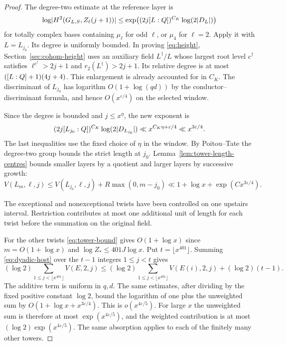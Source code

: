 \begin{proof}
The degree-two estimate at the reference layer is
\begin{equation}\label{eq:height}
 \log\lvert H^2(G_{L,S},Z_\ell(j+1))\rvert
      \le \exp\bigl((2j[L:Q])^{C_K}\log(2\lvert D_L\rvert)\bigr)
\end{equation}
for totally complex bases containing \(\mu_\ell\) for odd
\(\ell\), or \(\mu_4\) for \(\ell=2\). Apply it with \(L=L_{j_0}\).
Its degree is uniformly bounded. In proving \eqref{eq:height},
Section~\ref{sec:cohom-height} uses an auxiliary field
\(L^\dagger/L\) whose largest root level \(c^\dagger\) satisfies
\(\ell^{c^\dagger}>2j+1\) and \(r_2(L^\dagger)>2j+1\).
Its relative degree is at most \(([L:Q]+1)(4j+4)\).
This enlargement is already accounted for in \(C_K\).
The discriminant of \(L_{j_0}\)
has logarithm \(O(1+\log(qd))\) by the conductor--discriminant
formula, and hence \(O(x^{\varepsilon/4})\) on the selected window.

Since the degree is bounded and \(j\le x^\eta\), the new
exponent is
\[
   (2j[L_{j_0}:Q])^{C_K}\log(2|D_{L_{j_0}}|)
       \ll x^{C_K\eta+\varepsilon/4}
       \ll x^{3\varepsilon/4}.
\]
The last inequalities use the fixed choice of \(\eta\) in the
window.
By Poitou--Tate the degree-two group bounds the strict length
at \(j_0\). Lemma~\ref{lem:tower-length-centres} bounds smaller
layers by a quotient and larger layers by successive growth:
\[
 V(L_m,\ell,j)\le V(L_{j_0},\ell,j)+R\max(0,m-j_0)
       \ll 1+\log x+\exp(Cx^{3\varepsilon/4}).
\]

The exceptional and nonexceptional twists have been controlled on one upstairs interval. Restriction contributes at most one additional unit of length for each twist before the summation on the original field.

For the other twists \eqref{eq:tower-bound} gives
\(O(1+\log x)\) since \(m=O(1+\log x)\) and
\(\log Z_*\le401J\log x\). Put \(t=\lfloor x^{401}\rfloor\).
Summing \eqref{eq:dyadic-host} over the \(t-1\) integers
\(1\le j<t\) gives
\[
 (\log 2)\sum_{1\le j<\lfloor x^{401}\rfloor} V(E,2,j)
 \le (\log 2)\sum_{1\le j<\lfloor x^{401}\rfloor} V(E(i),2,j)
      +(\log 2)(t-1) .
\]
The additive term is uniform in \(q,d\). The same estimates, after dividing by the fixed positive constant \(\log 2\), bound the logarithm of one plus the unweighted sum by \(O(1+\log x+x^{3\varepsilon/4})\). This is \(o(x^{4\varepsilon/5})\). For large \(x\) the unweighted sum is therefore at most \(\exp(x^{4\varepsilon/5})\), and the weighted contribution is at most \((\log 2)\exp(x^{4\varepsilon/5})\). The same absorption applies to each of the finitely many other towers.
\end{proof}

